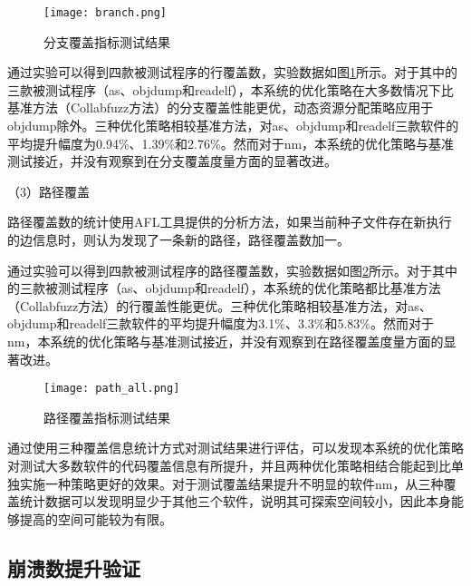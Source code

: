 \documentclass[master]{thesis-uestc}
\begin{document}
\begin{figure}[!htbp]
    \vspace{6pt}
    \centering
    \texttt{[image: branch.png]}
    \caption{分支覆盖指标测试结果}
    \label{branch}
\end{figure}


通过实验可以得到四款被测试程序的行覆盖数，实验数据如图\ref{branch}所示。对于其中的三款被测试程序（as、objdump和readelf），本系统的优化策略在大多数情况下比基准方法（Collabfuzz方法）的分支覆盖性能更优，动态资源分配策略应用于objdump除外。三种优化策略相较基准方法，对as、objdump和readelf三款软件的平均提升幅度为0.94\%、1.39\%和2.76\%。然而对于nm，本系统的优化策略与基准测试接近，并没有观察到在分支覆盖度量方面的显著改进。

（3）路径覆盖

路径覆盖数的统计使用AFL工具提供的分析方法，如果当前种子文件存在新执行的边信息时，则认为发现了一条新的路径，路径覆盖数加一。

通过实验可以得到四款被测试程序的路径覆盖数，实验数据如图\ref{path_all}所示。对于其中的三款被测试程序（as、objdump和readelf），本系统的优化策略都比基准方法（Collabfuzz方法）的行覆盖性能更优。三种优化策略相较基准方法，对as、objdump和readelf三款软件的平均提升幅度为3.1\%、3.3\%和5.83\%。然而对于nm，本系统的优化策略与基准测试接近，并没有观察到在路径覆盖度量方面的显著改进。

\begin{figure}[!htbp]
    \vspace{6pt}
    \centering
    \texttt{[image: path\_all.png]}
    \caption{路径覆盖指标测试结果}
    \label{path_all}
\end{figure}

通过使用三种覆盖信息统计方式对测试结果进行评估，可以发现本系统的优化策略对测试大多数软件的代码覆盖信息有所提升，并且两种优化策略相结合能起到比单独实施一种策略更好的效果。对于测试覆盖结果提升不明显的软件nm，从三种覆盖统计数据可以发现明显少于其他三个软件，说明其可探索空间较小，因此本身能够提高的空间可能较为有限。


\subsection{崩溃数提升验证}
\end{document}
